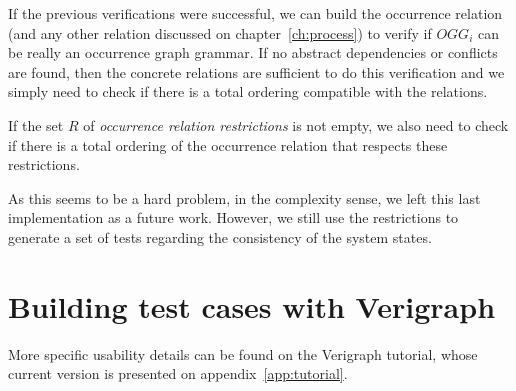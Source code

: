 If the previous verifications were successful, we can build the occurrence relation (and any other relation discussed on chapter~\ref{ch:process}) to verify if $OGG_i$ can be really an occurrence graph grammar. If no abstract dependencies or conflicts are found, then the concrete relations are sufficient to do this verification and we simply need to check if there is a total ordering compatible with the relations.


\begin{example}
\end{example}

If the set $R$ of \emph{occurrence relation restrictions} is not empty, we also need to check if there is a total ordering of the occurrence relation that respects these restrictions.

As this seems to be a hard problem, in the complexity sense, we left this last implementation as a future work. However, we still use the restrictions to generate a set of tests regarding the consistency of the system states.

\section{Building test cases with Verigraph}

More specific usability details can be found on the Verigraph tutorial, whose current version is presented on appendix~\ref{app:tutorial}.
